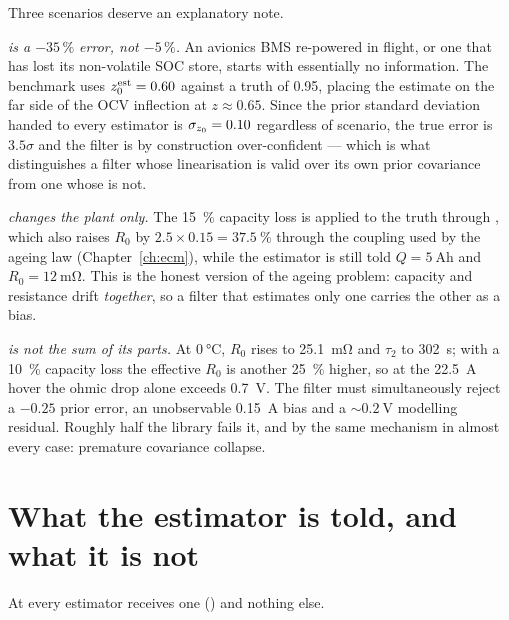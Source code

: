 Three scenarios deserve an explanatory note.

\emph{ is a $-35\,\%$ error, not $-5\,\%$.} An avionics BMS re-powered in flight,
or one that has lost its non-volatile SOC store, starts with essentially no information. The
benchmark uses $z_0^{\text{est}} = 0.60$ against a truth of \num{0.95}, placing the estimate on
the far side of the OCV inflection at $z\approx0.65$. Since the prior standard deviation handed to
every estimator is $\sigma_{z_0}=0.10$ regardless of scenario, the true error is $3.5\sigma$ and
the filter is by construction over-confident --- which is what distinguishes a filter whose
linearisation is valid over its own prior covariance from one whose is not.

\emph{ changes the plant only.} The \SI{15}{\percent} capacity loss is applied to
the truth through , which also raises $R_0$ by
$2.5\times0.15 = \SI{37.5}{\percent}$ through the coupling used by the ageing law
(Chapter~\ref{ch:ecm}), while the estimator is still told $Q=\SI{5}{\ampere\hour}$ and
$R_0=\SI{12}{\milli\ohm}$. This is the honest version of the ageing problem: capacity and resistance
drift \emph{together}, so a filter that estimates only one carries the other as a bias.

\emph{ is not the sum of its parts.} At $\SI{0}{\celsius}$, $R_0$ rises to
\SI{25.1}{\milli\ohm} and $\tau_2$ to \SI{302}{\second}; with a \SI{10}{\percent} capacity loss the
effective $R_0$ is another \SI{25}{\percent} higher, so at the \SI{22.5}{\ampere} hover the ohmic
drop alone exceeds \SI{0.7}{\volt}. The filter must simultaneously reject a $-0.25$ prior error, an
unobservable \SI{0.15}{\ampere} bias and a $\sim\SI{0.2}{\volt}$ modelling residual. Roughly half
the library fails it, and by the same mechanism in almost every case: premature covariance
collapse.

\section{What the estimator is told, and what it is not}
\label{sec:ds-truth}

At  every estimator receives one 
() and nothing else.

